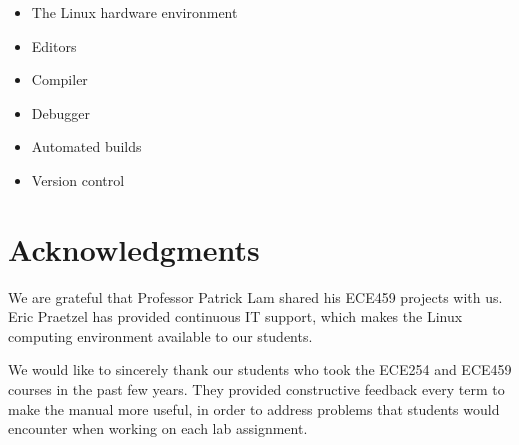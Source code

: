 \begin{itemize}
    \item The Linux hardware environment
    \item Editors
    \item Compiler 
    \item Debugger 
    \item Automated builds
    \item Version control
\end{itemize}



\section*{Acknowledgments}

We are grateful that Professor Patrick Lam shared his ECE459  projects with us. Eric Praetzel has provided continuous IT support, which makes the Linux computing environment available to our students.

We would like to sincerely thank our students who took the ECE254 and ECE459 courses in the past few years. They provided constructive feedback every term to make the manual more useful, in order to address problems that students would encounter when working on each lab assignment. 

